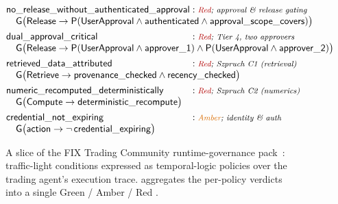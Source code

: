 \begin{figure}[H]
\centering
\small
\[
\begin{array}{@{}l@{\;:\;}l@{}}
\id{no\_release\_without\_authenticated\_approval} & \text{\footnotesize\itshape \textcolor{red!70!black}{Red}; approval \& release gating}\\
\multicolumn{2}{@{}l@{}}{\quad \mathsf{G}\big(\id{Release} \rightarrow \mathsf{P}(\id{UserApproval} \land \id{authenticated} \land \id{approval\_scope\_covers})\big)}\\[4pt]
\id{dual\_approval\_critical} & \text{\footnotesize\itshape \textcolor{red!70!black}{Red}; Tier 4, two approvers}\\
\multicolumn{2}{@{}l@{}}{\quad \mathsf{G}\big(\id{Release} \rightarrow \mathsf{P}(\id{UserApproval} \land \id{approver\_1}) \land \mathsf{P}(\id{UserApproval} \land \id{approver\_2})\big)}\\[4pt]
\id{retrieved\_data\_attributed} & \text{\footnotesize\itshape \textcolor{red!70!black}{Red}; Szpruch C1 (retrieval)}\\
\multicolumn{2}{@{}l@{}}{\quad \mathsf{G}\big(\id{Retrieve} \rightarrow \id{provenance\_checked} \land \id{recency\_checked}\big)}\\[4pt]
\id{numeric\_recomputed\_deterministically} & \text{\footnotesize\itshape \textcolor{red!70!black}{Red}; Szpruch C2 (numerics)}\\
\multicolumn{2}{@{}l@{}}{\quad \mathsf{G}\big(\id{Compute} \rightarrow \id{deterministic\_recompute}\big)}\\[4pt]
\id{credential\_not\_expiring} & \text{\footnotesize\itshape \textcolor{orange!85!black}{Amber}; identity \& auth}\\
\multicolumn{2}{@{}l@{}}{\quad \mathsf{G}\big(\id{action} \rightarrow \lnot\,\id{credential\_expiring}\big)}
\end{array}
\]
\caption{A slice of the FIX Trading Community runtime-governance pack~\cite{ponensfix,fixgov}: traffic-light
conditions expressed as temporal-logic policies over the trading agent's execution trace.  aggregates the per-policy verdicts into a single Green / Amber / Red .}
\label{fig:ex-fix-pack}
\end{figure}

